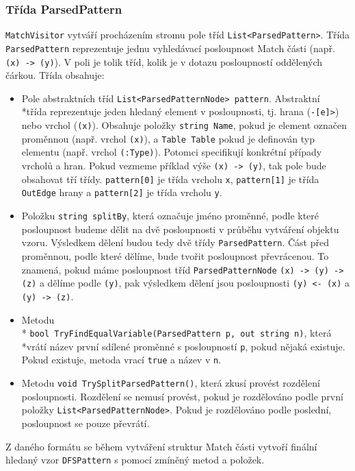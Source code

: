 \subsubsection{Třída ParsedPattern}

\texttt{MatchVisitor} vytváří procházením stromu pole tříd \texttt{List<ParsedPattern>}.
Třída \texttt{ParsedPattern} reprezentuje jednu vyhledávací posloupnost Match části (např. \texttt{(x) -> (y)}).
V poli je tolik tříd, kolik je v dotazu posloupností oddělených čárkou.
Třída obsahuje:
\begin{itemize}
\item Pole abstraktních tříd \texttt{List<ParsedPatternNode> pattern}.
Abstraktní \\*třída reprezentuje jeden hledaný element v posloupnosti, tj. hrana  (\texttt{-[e]>}) nebo vrchol (\texttt{(x)}).
Obsahuje položky \texttt{string Name}, pokud je element označen proměnnou (např. vrchol \texttt{(x)}), a \texttt{Table Table} pokud je definován typ elementu (např. vrchol \texttt{(:Type)}).
Potomci specifikují konkrétní případy vrcholů a hran. Pokud vezmeme příklad výše \texttt{(x) -> (y)}, tak pole bude obsahovat tří třídy.
\texttt{pattern[0]} je třída vrcholu \texttt{x}, \texttt{pattern[1]} je třída \texttt{OutEdge} hrany a \texttt{pattern[2]} je třída vrcholu \texttt{y}.

\item Položku \texttt{string splitBy}, která označuje jméno proměnné, podle které posloupnost budeme dělit na dvě posloupnosti v průběhu vytváření objektu vzoru.
Výsledkem dělení budou tedy dvě třídy \texttt{ParsedPattern}.
Část před proměnnou, podle které dělíme, bude tvořit posloupnost převrácenou.
To znamená, pokud máme posloupnost tříd \texttt{ParsedPatternNode} \texttt{(x) -> (y) -> (z)} a dělíme podle \texttt{(y)}, pak výsledkem dělení jsou posloupnosti 
\texttt{(y) <- (x)} a \texttt{(y) -> (z)}.

\item Metodu\\* \texttt{bool TryFindEqualVariable(ParsedPattern p, out string n)}, která \\*vrátí název první sdílené proměnné s posloupností \texttt{p}, pokud nějaká existuje.
Pokud existuje, metoda vrací \texttt{true} a název v \texttt{n}.

\item Metodu \texttt{void TrySplitParsedPattern()}, která zkusí provést rozdělení posloupnosti.
Rozdělení se nemusí provést, pokud je rozdělováno podle první položky \texttt{List<ParsedPatternNode>}. 
Pokud je rozdělováno podle poslední, posloupnost se pouze převrátí.

\end{itemize}
Z daného formátu se během vytváření struktur Match části vytvoří finální hledaný vzor \texttt{DFSPattern} s pomocí zmíněný metod a položek.

